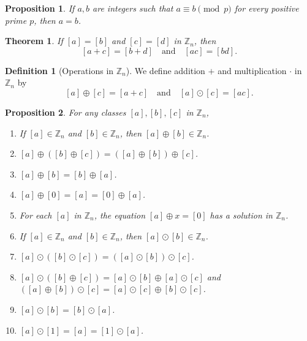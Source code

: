 \documentclass{article}
\newtheorem{theorem}{Theorem}[section]
\newtheorem{proposition}{Proposition}[section]
\theoremstyle{definition}
\newtheorem{definition}{Definition}[section]
\theoremstyle{remark}
\begin{document}
\begin{proposition}
If $a, b$ are integers such that $a \equiv b \pmod{p}$ for every positive prime $p$, then $a = b$.
\end{proposition}



\begin{theorem}
If $[a] = [b]$ and $[c] = [d]$ in $\mathbb{Z}_n$, then
\[
[a + c] = [b + d] \quad \text{and} \quad [ac] = [bd].
\]
\end{theorem}



\begin{definition}[Operations in $\mathbb{Z}_n$]
We define addition $+$ and multiplication $ \cdot$ in $\mathbb{Z}_n$ by 
\[
[a] \oplus [c] = [a + c] \quad \text{and} \quad [a] \odot [c] = [ac].
\]
\end{definition}






\begin{proposition}
For any classes $[a], [b], [c]$ in $\mathbb{Z}_n$,

\begin{enumerate}
\item If $[a] \in \mathbb{Z}_n$ and $[b] \in \mathbb{Z}_n$, then $[a] \oplus [b] \in \mathbb{Z}_n$.
\item $[a] \oplus ([b] \oplus [c]) = ([a] \oplus [b]) \oplus [c]$.
\item $[a] \oplus [b] = [b] \oplus [a]$.
\item $[a] \oplus [0] = [a] = [0] \oplus [a]$.
\item For each $[a]$ in $\mathbb{Z}_n$, the equation $[a] \oplus x = [0]$ has a solution in $\mathbb{Z}_n$.
\item If $[a] \in \mathbb{Z}_n$ and $[b] \in \mathbb{Z}_n$, then $[a] \odot [b] \in \mathbb{Z}_n$.
\item $[a] \odot ([b] \odot [c]) = ([a] \odot [b]) \odot [c]$.
\item $[a] \odot ([b] \oplus [c]) = [a] \odot [b] \oplus [a] \odot [c]$ and
\newline \hspace{0.5cm} $([a] \oplus [b]) \odot [c] = [a] \odot [c] \oplus [b] \odot [c]$.
\item $[a] \odot [b] = [b] \odot [a]$.
\item $[a] \odot [1] = [a] = [1] \odot [a]$.
\end{enumerate}
\end{proposition}
\end{document}
